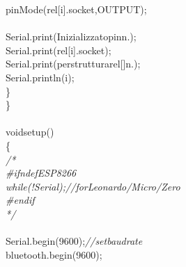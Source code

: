 \documentclass[a4paper, 12pt]{article}
\newcommand\SPC{\hspace*{0.6em}}
\newcommand\TAB{\hspace*{1.2em}}
\newcommand\QOT{\mbox{\char 34}}
\newcommand{\CppAComment}[1]{\textit{\textcolor[rgb]{0.2,0.4,1}{#1}}}
\newcommand{\CppAIdentifier}[1]{\textcolor[rgb]{0,1,0}{#1}}
\newcommand{\CppANumber}[1]{\textcolor[rgb]{0,0,1}{#1}}
\newcommand{\CppAReservedWord}[1]{\textcolor[rgb]{0,0.5,0}{#1}}
\newcommand{\CppASpace}[1]{\textcolor[rgb]{1,1,1}{\colorbox[rgb]{0,0,0}{#1}}}
\newcommand{\CppAString}[1]{\textcolor[rgb]{0.76,0.76,0.76}{#1}}
\newcommand{\CppASymbol}[1]{\textcolor[rgb]{1,0,0}{#1}}
\begin{document}
\begin{ttfamily}
\CppASpace{\SPC \SPC \SPC }\CppAIdentifier{pinMode}\CppASymbol{(}\CppAIdentifier{rel}\CppASymbol{[}\CppAIdentifier{i}\CppASymbol{]}\CppASymbol{.}\CppAIdentifier{socket}\CppASymbol{,}\CppASpace{\SPC }\CppAIdentifier{OUTPUT}\CppASymbol{)}\CppASymbol{;}\\
\CppASpace{\SPC \SPC \SPC }\\
\CppASpace{\SPC \SPC \SPC }\CppAIdentifier{Serial}\CppASymbol{.}\CppAIdentifier{print}\CppASymbol{(}\CppAString{\QOT Inizializzato\SPC pin\SPC n.\SPC \QOT }\CppASymbol{)}\CppASymbol{;}\\
\CppASpace{\SPC \SPC \SPC }\CppAIdentifier{Serial}\CppASymbol{.}\CppAIdentifier{print}\CppASymbol{(}\CppAIdentifier{rel}\CppASymbol{[}\CppAIdentifier{i}\CppASymbol{]}\CppASymbol{.}\CppAIdentifier{socket}\CppASymbol{)}\CppASymbol{;}\\
\CppASpace{\SPC \SPC \SPC }\CppAIdentifier{Serial}\CppASymbol{.}\CppAIdentifier{print}\CppASymbol{(}\CppAString{\QOT \SPC per\SPC struttura\SPC rel[]\SPC n.\SPC \QOT }\CppASymbol{)}\CppASymbol{;}\\
\CppASpace{\SPC \SPC \SPC }\CppAIdentifier{Serial}\CppASymbol{.}\CppAIdentifier{println}\CppASymbol{(}\CppAIdentifier{i}\CppASymbol{)}\CppASymbol{;}\\
\CppASpace{\SPC \SPC \SPC }\CppASymbol{\}}\\
\CppASymbol{\}}\\
\\
\CppAReservedWord{void}\CppASpace{\SPC }\CppAIdentifier{setup}\CppASpace{\SPC }\CppASymbol{(}\CppASymbol{)}\\
\CppASpace{\SPC }\CppASymbol{\{}\\
\CppASpace{\SPC \SPC }\CppAComment{/*}\\
\CppAComment{\SPC \SPC \#ifndef\SPC ESP8266}\\
\CppAComment{\SPC \SPC while\SPC (!Serial);\SPC //\SPC for\SPC Leonardo/Micro/Zero}\\
\CppAComment{\SPC \SPC \#endif}\\
\CppAComment{\SPC \SPC */}\CppASpace{\TAB \SPC }\\
\CppASpace{\TAB \SPC }\\
\CppASpace{\SPC \SPC }\CppAIdentifier{Serial}\CppASymbol{.}\CppAIdentifier{begin}\CppASymbol{(}\CppANumber{9600}\CppASymbol{)}\CppASymbol{;}\CppASpace{\SPC }\CppAComment{//set\SPC baud\SPC rate}\\
\CppASpace{\SPC \SPC }\CppAIdentifier{bluetooth}\CppASymbol{.}\CppAIdentifier{begin}\CppASymbol{(}\CppANumber{9600}\CppASymbol{)}\CppASymbol{;}\\

\end{ttfamily}
\end{document}
